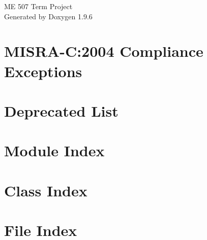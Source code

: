 \documentclass[twoside]{book}
\newcommand{\+}{\discretionary{\mbox{\scriptsize$\hookleftarrow$}}{}{}}
\newcommand{\clearemptydoublepage}{%
    \newpage{\pagestyle{empty}\cleardoublepage}%
  }
\begin{document}
  \raggedbottom
    \hypersetup{pageanchor=false,
                bookmarksnumbered=true,
                pdfencoding=unicode
               }
  \begin{titlepage}
  \vspace*{7cm}
  \begin{center}%
  {\Large ME 507 Term Project}\\
  \vspace*{1cm}
  {\large Generated by Doxygen 1.9.6}\\
  \end{center}
  \end{titlepage}
  \clearemptydoublepage
  \tableofcontents
  \clearemptydoublepage
  \hypersetup{pageanchor=true}
\chapter{MISRA-\/C\+:2004 Compliance Exceptions}
\label{CMSIS_MISRA_Exceptions}

\chapter{Deprecated List}
\label{deprecated}

\chapter{Module Index}

\chapter{Class Index}

\chapter{File Index}

\end{document}
